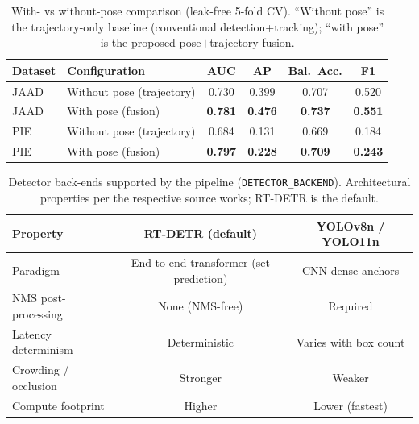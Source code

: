 \begin{table}[h]
\centering
\small
\setlength{\tabcolsep}{4pt}
\renewcommand{\arraystretch}{1.15}
\caption{With- vs without-pose comparison (leak-free 5-fold CV). ``Without pose''
is the trajectory-only baseline (conventional detection+tracking); ``with pose''
is the proposed pose$+$trajectory fusion.}
\label{tab:withoutpose}
\begin{tabular}{|l|l|c|c|c|c|}
\hline
\textbf{Dataset} & \textbf{Configuration} & \textbf{AUC} & \textbf{AP} & \textbf{Bal.\ Acc.} & \textbf{F1} \\
\hline
JAAD & Without pose (trajectory) & 0.730 & 0.399 & 0.707 & 0.520 \\ \hline
JAAD & With pose (fusion)        & \textbf{0.781} & \textbf{0.476} & \textbf{0.737} & \textbf{0.551} \\ \hline
PIE  & Without pose (trajectory) & 0.684 & 0.131 & 0.669 & 0.184 \\ \hline
PIE  & With pose (fusion)        & \textbf{0.797} & \textbf{0.228} & \textbf{0.709} & \textbf{0.243} \\ \hline
\end{tabular}
\end{table}

\begin{table}[h]
\centering
\small
\setlength{\tabcolsep}{4pt}
\renewcommand{\arraystretch}{1.15}
\caption{Detector back-ends supported by the pipeline (\texttt{DETECTOR\_BACKEND}).
Architectural properties per the respective source works; RT-DETR is the default.}
\label{tab:detector_qual}
\begin{tabular}{|p{2.5cm}|c|c|}
\hline
\textbf{Property} & \textbf{RT-DETR (default)} & \textbf{YOLOv8n / YOLO11n} \\
\hline
Paradigm & End-to-end transformer (set prediction) & CNN dense anchors \\ \hline
NMS post-processing & None (NMS-free) & Required \\ \hline
Latency determinism & Deterministic & Varies with box count \\ \hline
Crowding / occlusion & Stronger & Weaker \\ \hline
Compute footprint & Higher & Lower (fastest) \\ \hline
\end{tabular}
\end{table}

